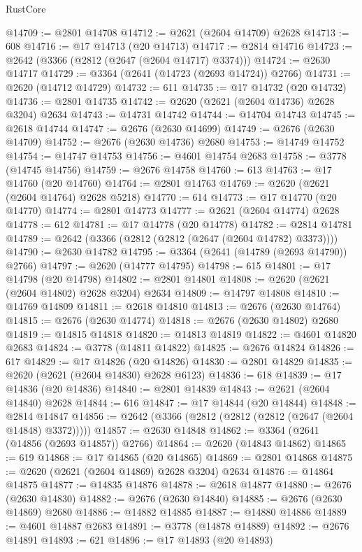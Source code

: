 \begin{lexlean}{RustCore}
\begin{coremodule}
@14709 := @2801 @14708
@14712 := @2621 (@2604 @14709) @2628
@14713 := 608
@14716 := @17 @14713 (@20 @14713)
@14717 := @2814 @14716
@14723 := @2642 (@3366 (@2812 (@2647 (@2604 @14717) @3374)))
@14724 := @2630 @14717
@14729 := @3364 (@2641 (@14723 (@2693 @14724)) @2766)
@14731 := @2620 (@14712 @14729)
@14732 := 611
@14735 := @17 @14732 (@20 @14732)
@14736 := @2801 @14735
@14742 := @2620 (@2621 (@2604 @14736) @2628 @3204) @2634
@14743 := @14731 @14742
@14744 := @14704 @14743
@14745 := @2618 @14744
@14747 := @2676 (@2630 @14699)
@14749 := @2676 (@2630 @14709)
@14752 := @2676 (@2630 @14736) @2680
@14753 := @14749 @14752
@14754 := @14747 @14753
@14756 := @4601 @14754 @2683
@14758 := @3778 (@14745 @14756)
@14759 := @2676 @14758
@14760 := 613
@14763 := @17 @14760 (@20 @14760)
@14764 := @2801 @14763
@14769 := @2620 (@2621 (@2604 @14764) @2628 @5218)
@14770 := 614
@14773 := @17 @14770 (@20 @14770)
@14774 := @2801 @14773
@14777 := @2621 (@2604 @14774) @2628
@14778 := 612
@14781 := @17 @14778 (@20 @14778)
@14782 := @2814 @14781
@14789 := @2642 (@3366 (@2812 (@2812 (@2647 (@2604 @14782) @3373))))
@14790 := @2630 @14782
@14795 := @3364 (@2641 (@14789 (@2693 @14790)) @2766)
@14797 := @2620 (@14777 @14795)
@14798 := 615
@14801 := @17 @14798 (@20 @14798)
@14802 := @2801 @14801
@14808 := @2620 (@2621 (@2604 @14802) @2628 @3204) @2634
@14809 := @14797 @14808
@14810 := @14769 @14809
@14811 := @2618 @14810
@14813 := @2676 (@2630 @14764)
@14815 := @2676 (@2630 @14774)
@14818 := @2676 (@2630 @14802) @2680
@14819 := @14815 @14818
@14820 := @14813 @14819
@14822 := @4601 @14820 @2683
@14824 := @3778 (@14811 @14822)
@14825 := @2676 @14824
@14826 := 617
@14829 := @17 @14826 (@20 @14826)
@14830 := @2801 @14829
@14835 := @2620 (@2621 (@2604 @14830) @2628 @6123)
@14836 := 618
@14839 := @17 @14836 (@20 @14836)
@14840 := @2801 @14839
@14843 := @2621 (@2604 @14840) @2628
@14844 := 616
@14847 := @17 @14844 (@20 @14844)
@14848 := @2814 @14847
@14856 := @2642 (@3366 (@2812 (@2812 (@2812 (@2647 (@2604 @14848) @3372)))))
@14857 := @2630 @14848
@14862 := @3364 (@2641 (@14856 (@2693 @14857)) @2766)
@14864 := @2620 (@14843 @14862)
@14865 := 619
@14868 := @17 @14865 (@20 @14865)
@14869 := @2801 @14868
@14875 := @2620 (@2621 (@2604 @14869) @2628 @3204) @2634
@14876 := @14864 @14875
@14877 := @14835 @14876
@14878 := @2618 @14877
@14880 := @2676 (@2630 @14830)
@14882 := @2676 (@2630 @14840)
@14885 := @2676 (@2630 @14869) @2680
@14886 := @14882 @14885
@14887 := @14880 @14886
@14889 := @4601 @14887 @2683
@14891 := @3778 (@14878 @14889)
@14892 := @2676 @14891
@14893 := 621
@14896 := @17 @14893 (@20 @14893)

\end{coremodule}
\end{lexlean}
